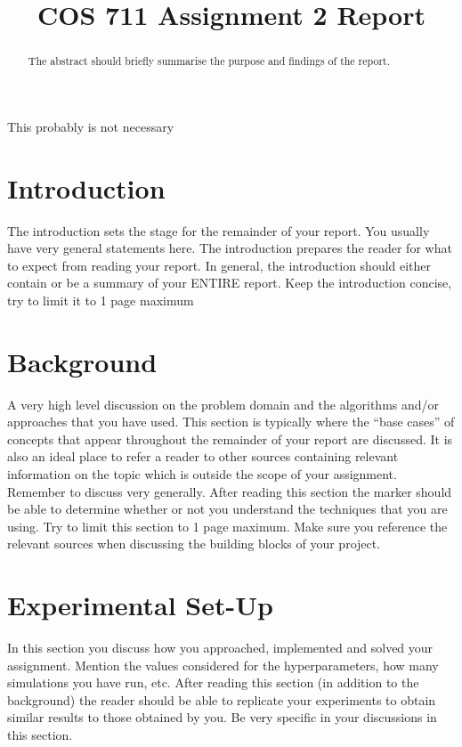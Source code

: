 \documentclass[conference]{IEEEtran}
\begin{document}
\title{COS 711 Assignment 2 Report\\
}

\author{
}

\maketitle

\begin{abstract}
The abstract should briefly summarise the purpose and findings of the report.
\end{abstract}

\begin{IEEEkeywords}
This probably is not necessary
\end{IEEEkeywords}

\section{Introduction}
The introduction sets the stage for the remainder of your report. You usually have very general statements here. The introduction prepares the reader for what to expect from reading your report. In general, the introduction should either contain or be a summary of your ENTIRE report. Keep the introduction concise, try to limit it to 1 page maximum

\section{Background}
A very high level discussion on the problem domain and the algorithms and/or approaches that you have used. This section is typically where the “base cases” of concepts that appear throughout the remainder of your report are discussed. It is also an ideal place to refer a reader to other sources containing relevant information on the topic which is outside the scope of your assignment. Remember to discuss very generally. After reading this section the marker should be able to determine whether or not you understand the techniques that you are using. Try to limit this section to 1 page maximum. Make sure you reference the relevant sources when discussing the building blocks of your project.

\section{Experimental Set-Up}
In this section you discuss how you approached, implemented and solved your assignment. Mention the values considered for the hyperparameters, how many simulations you have run, etc. After reading this section (in addition to the background) the reader should be able to replicate your experiments to obtain similar results to those obtained by you. Be very specific in your discussions in this section.
\end{document}
